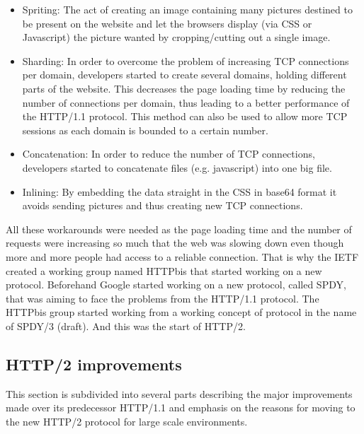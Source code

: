 \begin{itemize}
\item Spriting: The act of creating an image containing many pictures destined to be present on the website and let the browsers display (via CSS or Javascript) the picture wanted by cropping/cutting out a single image.
\item Sharding: In order to overcome the problem of increasing TCP connections per domain, developers started to create several domains, holding different parts of the website. This decreases the page loading time by reducing the number of connections per domain, thus leading to a better performance of the HTTP/1.1 protocol. This method can also be used to allow more TCP sessions as each domain is bounded to a certain number.
\item Concatenation: In order to reduce the number of TCP connections, developers started to concatenate files (e.g. javascript) into one big file. 
\item Inlining: By embedding the data straight in the CSS in base64 format it avoids sending pictures and thus creating new TCP connections. 
\end{itemize}
All these workarounds were needed as the page loading time and the number of requests were increasing so much that the web was slowing down even though more and more people had access to a reliable connection. That is why the IETF created a working group named HTTPbis\cite{httpbis} that started working on a new protocol. Beforehand Google started working on a new protocol, called SPDY\cite{spdy}, that was aiming to face the problems from the HTTP/1.1 protocol. The HTTPbis group started working from a working concept of protocol in the name of SPDY/3 (draft). And this was the start of HTTP/2.
\newpage
\subsection{HTTP/2 improvements}
This section is subdivided into several parts describing the major improvements made over its predecessor HTTP/1.1 and emphasis on the reasons for moving to the new HTTP/2 protocol for large scale environments. 


